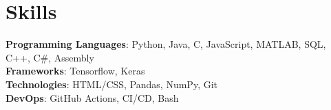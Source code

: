\section{Skills}
    \begin{itemize}[leftmargin=0.15in, label={}]
	\small{\item{
		\textbf{Programming Languages}{: Python, Java, C, JavaScript, MATLAB, SQL, C++, C\#, Assembly} \\
		\textbf{Frameworks}{: Tensorflow, Keras} \\
		\textbf{Technologies}{: HTML/CSS, Pandas, NumPy, Git} \\
		\textbf{DevOps}{: GitHub Actions, CI/CD, Bash} \\
	}}
    \end{itemize}
